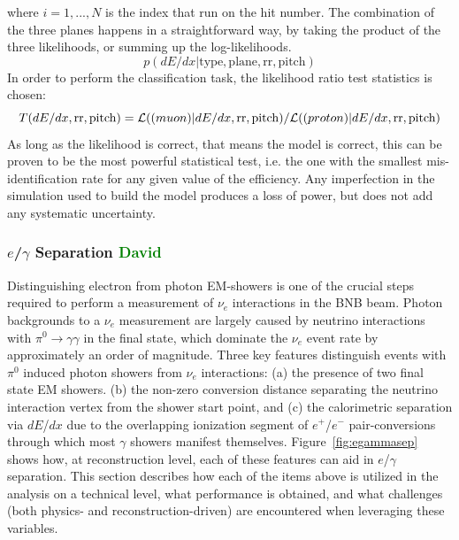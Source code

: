 \documentclass[a4paper]{article}
\begin{document}
where $i=1, ..., N$ is the index that run on the hit number.
The combination of the three planes happens in a straightforward way, by taking the product of the three likelihoods, or summing up the log-likelihoods.
\[ p(dE/dx | \text{type}, \text{plane}, \text{rr}, \text{pitch}) \]
In order to perform the classification task, the likelihood ratio test statistics is chosen:
\[ T(dE/dx, \text{rr}, \text{pitch}) = \mathcal{L}(\text(muon)| dE/dx, \text{rr}, \text{pitch}) /  \mathcal{L}(\text(proton)| dE/dx, \text{rr}, \text{pitch}) \]
As long as the likelihood is correct, that means the model is correct, this can be proven to be the most powerful statistical test, i.e. the one with the smallest mis-identification rate for any given value of the efficiency.
Any imperfection in the simulation used to build the model produces a loss of power, but does not add any systematic uncertainty.


\subsubsection{$e$/$\gamma$ Separation \textcolor{green}{David}}
\label{subsec:egammaspearation}
\par Distinguishing electron from photon EM-showers is one of the crucial steps required to perform a measurement of $\nu_e$ interactions in the BNB beam. Photon backgrounds to a $\nu_e$ measurement are largely caused by neutrino interactions with $\pi^0 \rightarrow \gamma\gamma$ in the final state, which dominate the $\nu_e$ event rate by approximately an order of magnitude. Three key features distinguish events with $\pi^0$ induced photon showers from $\nu_e$ interactions: (a) the presence of two final state EM showers. (b) the non-zero conversion distance separating the neutrino interaction vertex from the shower start point, and (c) the calorimetric separation via $dE$/$dx$ due to the overlapping ionization segment of $e^+$/$e^-$ pair-conversions through which most $\gamma$ showers manifest themselves. Figure~\ref{fig:egammasep} shows how, at reconstruction level, each of these features can aid in $e$/$\gamma$ separation. This section describes how each of the items above is utilized in the analysis on a technical level, what performance is obtained, and what challenges (both physics- and reconstruction-driven) are encountered when leveraging these variables.
\end{document}
